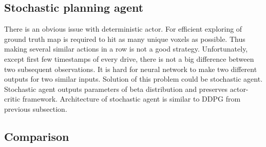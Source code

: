 \subsection{Stochastic planning agent}
There is an obvious issue with deterministic actor. For efficient exploring of ground truth map is required to hit as many unique voxels as possible. Thus making several similar actions in a row is not a good strategy. Unfortunately, except first few timestamps of every drive, there is not a big difference between two subsequent observations. It is hard for neural network to make two different outputs for two similar inputs. Solution of this problem could be stochastic agent. Stochastic agent outputs parameters of beta distribution and preserves actor-critic framework. Architecture of stochastic agent is similar to DDPG from previous subsection. 

\subsection{Comparison}
